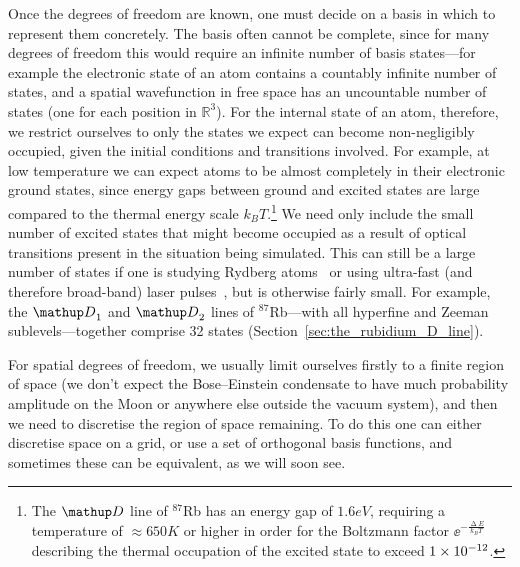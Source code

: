 Once the degrees of freedom are known, one must decide on a basis in which to represent them concretely. The basis often cannot be complete, since for many degrees of freedom this would require an infinite number of basis states---for example the electronic state of an atom contains a countably infinite number of states, and a spatial wavefunction in free space has an uncountable number of states (one for each position in $\mathbb{R}^3$). For the internal state of an atom, therefore, we restrict ourselves to only the states we expect can become non-negligibly occupied, given the initial conditions and transitions involved. For example, at low temperature we can expect atoms to be almost completely in their electronic ground states, since energy gaps between ground and excited states are large compared to the thermal energy scale $k_B T$.\footnote{The $\up{D}$ line of $^{87}$Rb has an energy gap of $1.6\unit{eV}$, requiring a temperature of $\approx 650\unit{K}$ or higher in order for the Boltzmann factor $\ee^{-\frac{\upDelta E}{k_B T}}$ describing the thermal occupation of the excited state to exceed $1\times 10^{-12}$.} We need only include the small number of excited states that might become occupied as a result of optical transitions present in the situation being simulated. This can still be a large number of states if one is studying Rydberg atoms~\cite{saffman_quantum_2010, urban_observation_2009} or using ultra-fast (and therefore broad-band) laser pulses~\cite{blinov_broadband_2006, mcculloch_high-coherence_2013, brabec_intense_2000}, but is otherwise fairly small. For example, the $\up{D}_1$ and $\up{D}_2$ lines of $^{87}$Rb---with all hyperfine and Zeeman sublevels---together comprise 32 states (Section~\ref{sec:the_rubidium_D_line}).

For spatial degrees of freedom, we usually limit ourselves firstly to a finite region of space (we don't expect the Bose--Einstein condensate to have much probability amplitude on the Moon or anywhere else outside the vacuum system), and then we need to discretise the region of space remaining. To do this one can either discretise space on a grid, or use a set of orthogonal basis functions, and sometimes these can be equivalent, as we will soon see.

